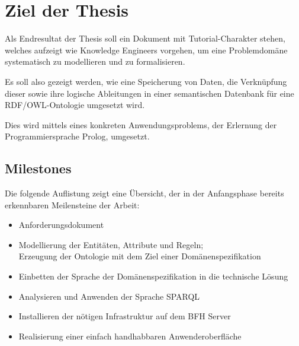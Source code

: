 \chapter{Ziel der Thesis}
\label{chap:thesisziel}
Als Endresultat der Thesis soll ein Dokument mit Tutorial-Charakter stehen, welches aufzeigt wie Knowledge Engineers vorgehen, um eine Problemdomäne systematisch zu modellieren und zu formalisieren.

Es soll also gezeigt werden, wie eine Speicherung von Daten, die Verknüpfung dieser sowie ihre logische Ableitungen in einer semantischen Datenbank für eine RDF/OWL-Ontologie umgesetzt wird.~\cite{Aufgabenstellung}

Dies wird mittels eines konkreten Anwendungsproblems, der Erlernung der Programmiersprache Prolog, umgesetzt.

\section{Milestones}
\label{sec:Milestones}
Die folgende Auflistung zeigt eine Übersicht, der in der Anfangsphase bereits erkennbaren Meilensteine der Arbeit:
\begin{itemize}
	\item Anforderungsdokument \\
	\item Modellierung der Entitäten, Attribute und Regeln;\\ Erzeugung der Ontologie mit dem Ziel einer Domänenspezifikation
	\item Einbetten der Sprache der Domänenspezifikation in die technische Lösung \\
	\item Analysieren und Anwenden der Sprache SPARQL \\
	\item Installieren der nötigen Infrastruktur auf dem BFH Server\\
	\item Realisierung einer einfach handhabbaren Anwenderoberfläche \\
\end{itemize}

